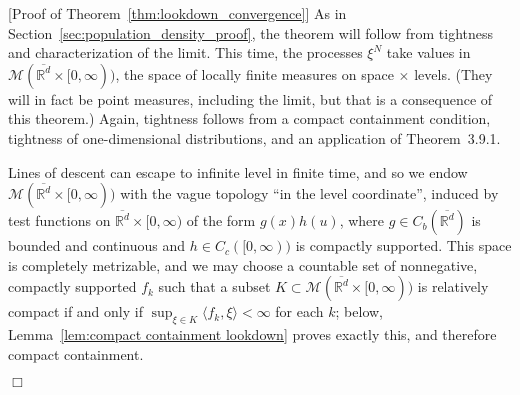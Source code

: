 \documentclass[12pt]{article}
\newenvironment {proof}{{\noindent\bf Proof }}{\hfill $\Box$ \medskip}
\newcommand{\IR}{\mathbb R}
\newcommand{\lp}{\xi}              %
\newcommand{\lpmeasures}{\mathcal{M}(\overline{\IR^d} \times [0,\infty))} %
\numberwithin{equation}{section}
\begin{document}
\begin{proof}[Proof of Theorem~\ref{thm:lookdown_convergence}]
    As in Section~\ref{sec:population_density_proof},
    the theorem will follow from tightness and characterization of the limit.
    This time, the processes $\lp^N$ take values in $\lpmeasures$,
    the space of locally finite measures on space $\times$ levels.
    (They will in fact be point measures, including the limit,
    but that is a consequence of this theorem.)
    Again, tightness follows from a compact containment condition,
    tightness of one-dimensional distributions,
    and an application of \citet{ethier/kurtz:1986} Theorem~3.9.1.

    Lines of descent can escape to infinite level in finite time, and so
    we endow $\lpmeasures$ with the vague topology ``in the level coordinate'',
    induced by test functions on $\overline{\IR^d} \times [0,\infty)$
    of the form $g(x) h(u)$, where $g \in C_b(\overline{\IR^d})$ is bounded and continuous
    and $h \in C_c([0, \infty))$ is compactly supported.
    This space is completely metrizable,
    and we may choose a countable set of nonnegative, compactly supported $f_k$
    such that a subset $K \subset \lpmeasures$ is relatively compact if and only if
    $\sup_{\lp \in K} \langle f_k, \lp \rangle < \infty$ for each $k$;
    below, Lemma~\ref{lem:compact containment lookdown} proves exactly this, and therefore compact containment.


\end{proof}
\end{document}
